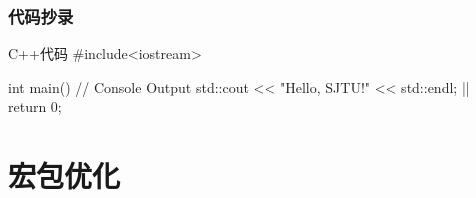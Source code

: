 \documentclass[
    aspectratio=169,  %
]{ctexbeamer}
\begin{document}
\begin{frame}[fragile]
  \frametitle{代码抄录}

  \begin{codeblock}[language=c++,escapechar=|]{C++代码}
#include<iostream>

int main(){
  // Console Output
  std::cout << "Hello, SJTU!" << std::endl;
|\highlightline|  return 0;
}
  \end{codeblock}
\end{frame}

\section{宏包优化}
\end{document}
